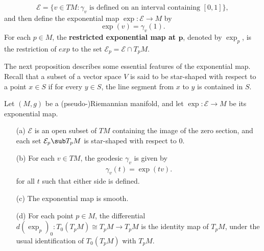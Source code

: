 \[\mathcal{E}=\{v\in TM:\text{$\gamma_v$ is defined on an interval containing $[0,1]$}\},\]
and then define the exponential map $\exp:\mathcal{E}\to M$ by
\[\exp(v)=\gamma_v(1).\]
For each $p\in M$, the \textbf{restricted exponential map at $\bm{p}$}, denoted by $\exp_p$, is the restriction of $exp$ to the set $\mathcal{E}_p=\mathcal{E}\cap T_pM$.\par
The next proposition describes some essential features of the exponential map. Recall that a subset of a vector space $V$ is said to be star-shaped with respect to a point 
$x\in S$ if for every $y\in S$, the line segment from $x$ to $y$ is contained in $S$.
\begin{proposition}\label{Riemann exp prop}
Let $(M,g)$ be a (pseudo-)Riemannian manifold, and let $\exp:\mathcal{E}\to M$ be its exponential map.
\begin{itemize}
\item[(a)] $\mathcal{E}$ is an open subset of $TM$ containing the image of the zero section, and each set $\mathcal{E}_p\sub T_pM$ is star-shaped with respect to $0$.
\item[(b)] For each $v\in TM$, the geodesic $\gamma_v$ is given by
\begin{align}\label{Riemann exp prop-1}
\gamma_v(t)=\exp(tv).
\end{align}
for all $t$ such that either side is defined.
\item[(c)] The exponential map is smooth.
\item[(d)] For each point $p\in M$, the differential $d(\exp_p)_0:T_0(T_pM)\cong T_pM\to T_pM$ is the identity map of $T_pM$, under the usual identification of 
$T_0(T_pM)$ with $T_pM$.
\end{itemize}
\end{proposition}
